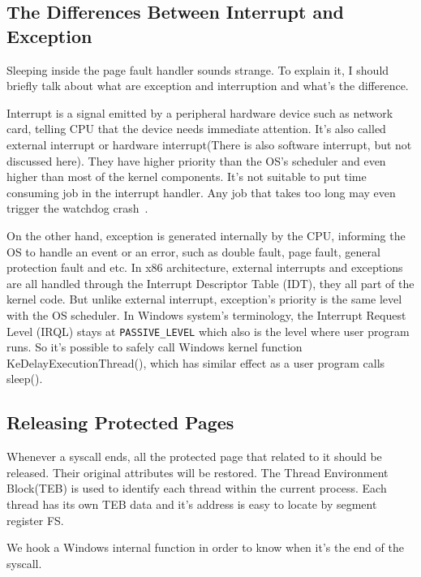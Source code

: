 \subsection{The Differences Between Interrupt and Exception}

Sleeping inside the page fault handler sounds strange. To explain it, I should briefly talk about what are exception and interruption and what's the difference.

Interrupt is a signal emitted by a peripheral hardware device such as network card, telling CPU that the device needs immediate attention. It's also called external interrupt or hardware interrupt(There is also software interrupt, but not discussed here). They have higher priority than the OS's scheduler and even higher than most of the kernel components. It's not suitable to put time consuming job in the interrupt handler. Any job that takes too long may even trigger the watchdog crash~\cite{msdnwatchdog}.   

On the other hand, exception is generated internally by the CPU, informing the OS to handle an event or an error, such as double fault, page fault, general protection fault and etc. In x86 architecture, external interrupts and exceptions are all handled through the Interrupt Descriptor Table (IDT), they all part of the kernel code. But unlike external interrupt, exception's priority is the same level with the OS scheduler. In Windows system's terminology, the Interrupt Request Level (IRQL) stays at \texttt{PASSIVE\_LEVEL} which also is the level where user program runs. So it's possible to safely call Windows kernel function KeDelayExecutionThread(), which has similar effect as a user program calls sleep(). 


\subsection{Releasing Protected Pages}

Whenever a syscall ends, all the protected page that related to it should be released. Their original attributes will be restored. The Thread Environment Block(TEB) is used to identify each thread within the current process. Each thread has its own TEB data and it's address is easy to locate by segment register FS. 

We hook a Windows internal function in order to know when it's the end of the syscall. 




